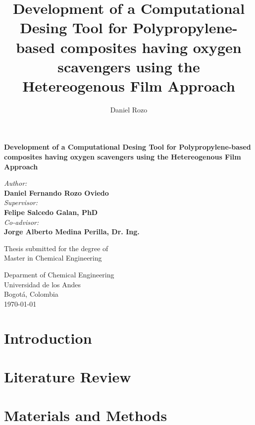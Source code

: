 \documentclass[twoside,11pt]{report}
\title{Development of a Computational Desing Tool for Polypropylene-based composites having oxygen scavengers using the Hetereogenous Film Approach}
\author{Daniel Rozo}
\date{\Today}
\begin{document}
\begin{titlepage}
\begin{center}
\BgThispage
        \huge
        \textbf{Development of a Computational Desing Tool for Polypropylene-based composites having oxygen scavengers using the Hetereogenous Film Approach}
        
        \vspace{1cm}
        \LARGE

        \vspace{1cm}
        \textit{Author:}\\
        \textbf{Daniel Fernando Rozo Oviedo}\\
        \vspace{1.5cm}
        \textit{Supervisor:}\\
        \textbf{Felipe Salcedo Galan, PhD}\\
        \textit{Co-advisor:}\\
        \textbf{Jorge Alberto Medina Perilla, Dr. Ing.}
        \vfill
 
        Thesis submitted for the degree of\\ Master in Chemical Engineering
        
 
        \vspace{0.5cm}
 
        
 
        \Large
        Deparment of Chemical Engineering\\
        Universidad de los Andes\\
        Bogotá, Colombia\\
        \today
 
    \end{center}
\afterpage{\null\newpage}
\end{titlepage}
\tableofcontents
\vspace{\fill}
\chapter{Introduction}
\pagestyle{fancy}

\chapter{Literature Review}

\chapter{Materials and Methods}

\end{document}
